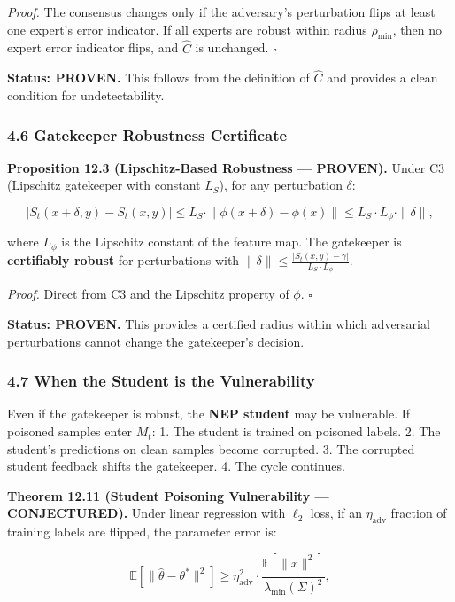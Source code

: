 \documentclass[
  12pt,
]{article}
\begin{document}
\emph{Proof.} The consensus changes only if the adversary's perturbation
flips at least one expert's error indicator. If all experts are robust
within radius \(\rho_{\min}\), then no expert error indicator flips, and
\(\hat{C}\) is unchanged. \(\square\)

\textbf{Status: PROVEN.} This follows from the definition of \(\hat{C}\)
and provides a clean condition for undetectability.

\subsubsection{4.6 Gatekeeper Robustness
Certificate}\label{gatekeeper-robustness-certificate}

\textbf{Proposition 12.3 (Lipschitz-Based Robustness --- PROVEN).} Under
C3 (Lipschitz gatekeeper with constant \(L_S\)), for any perturbation
\(\delta\):

\[|S_t(x + \delta, y) - S_t(x, y)| \leq L_S \cdot \|\phi(x + \delta) - \phi(x)\| \leq L_S \cdot L_\phi \cdot \|\delta\|,\]

where \(L_\phi\) is the Lipschitz constant of the feature map. The
gatekeeper is \textbf{certifiably robust} for perturbations with
\(\|\delta\| \leq \frac{|S_t(x,y) - \gamma|}{L_S \cdot L_\phi}\).

\emph{Proof.} Direct from C3 and the Lipschitz property of \(\phi\).
\(\square\)

\textbf{Status: PROVEN.} This provides a certified radius within which
adversarial perturbations cannot change the gatekeeper's decision.

\subsubsection{4.7 When the Student is the
Vulnerability}\label{when-the-student-is-the-vulnerability}

Even if the gatekeeper is robust, the \textbf{NEP student} may be
vulnerable. If poisoned samples enter \(M_t\): 1. The student is trained
on poisoned labels. 2. The student's predictions on clean samples become
corrupted. 3. The corrupted student feedback shifts the gatekeeper. 4.
The cycle continues.

\textbf{Theorem 12.11 (Student Poisoning Vulnerability ---
CONJECTURED).} Under linear regression with \(\ell_2\) loss, if an
\(\eta_{\text{adv}}\) fraction of training labels are flipped, the
parameter error is:

\[\mathbb{E}[\|\hat{\theta} - \theta^*\|^2] \geq \eta_{\text{adv}}^2 \cdot \frac{\mathbb{E}[\|x\|^2]}{\lambda_{\min}(\Sigma)^2},\]
\end{document}
